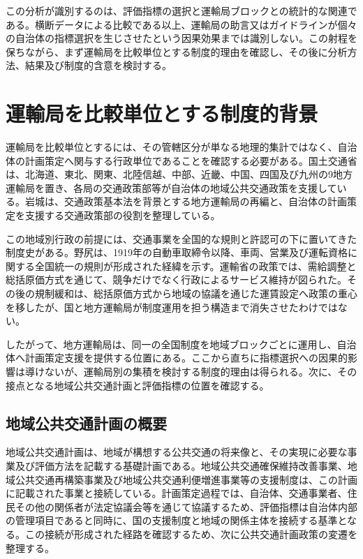この分析が識別するのは、評価指標の選択と運輸局ブロックとの統計的な関連である。横断データによる比較である以上、運輸局の助言又はガイドラインが個々の自治体の指標選択を生じさせたという因果効果までは識別しない。この射程を保ちながら、まず運輸局を比較単位とする制度的理由を確認し、その後に分析方法、結果及び制度的含意を検討する。

\section{運輸局を比較単位とする制度的背景}
\label{sec:ch6_organization}

運輸局を比較単位とするには、その管轄区分が単なる地理的集計ではなく、自治体の計画策定へ関与する行政単位であることを確認する必要がある。国土交通省は、北海道、東北、関東、北陸信越、中部、近畿、中国、四国及び九州の9地方運輸局を置き、各局の交通政策部等が自治体の地域公共交通政策を支援している。岩城\cite{iwaki2016}は、交通政策基本法を背景とする地方運輸局の再編と、自治体の計画策定を支援する交通政策部の役割を整理している。

この地域別行政の前提には、交通事業を全国的な規則と許認可の下に置いてきた制度史がある。野尻\cite{nojio2010}は、1919年の自動車取締令以降、車両、営業及び運転資格に関する全国統一の規則が形成された経緯を示す。運輸省の政策では、需給調整と総括原価方式を通じて、競争だけでなく行政によるサービス維持が図られた\cite{unsho1963,rinso1971}。その後の規制緩和は、総括原価方式から地域の協議を通じた運賃設定へ政策の重心を移したが、国と地方運輸局が制度運用を担う構造まで消失させたわけではない\cite{publictransport2002,takeuchi2019,kato2020}。

したがって、地方運輸局は、同一の全国制度を地域ブロックごとに運用し、自治体へ計画策定支援を提供する位置にある。ここから直ちに指標選択への因果的影響は導けないが、運輸局別の集積を検討する制度的理由は得られる。次に、その接点となる地域公共交通計画と評価指標の位置を確認する。

\subsection{地域公共交通計画の概要}

地域公共交通計画は、地域が構想する公共交通の将来像と、その実現に必要な事業及び評価方法を記載する基礎計画である。地域公共交通確保維持改善事業、地域公共交通再構築事業及び地域公共交通利便増進事業等の支援制度は、この計画に記載された事業と接続している\cite{mlit2023}。計画策定過程では、自治体、交通事業者、住民その他の関係者が法定協議会等を通じて協議するため、評価指標は自治体内部の管理項目であると同時に、国の支援制度と地域の関係主体を接続する基準となる。この接続が形成された経路を確認するため、次に公共交通計画政策の変遷を整理する。

